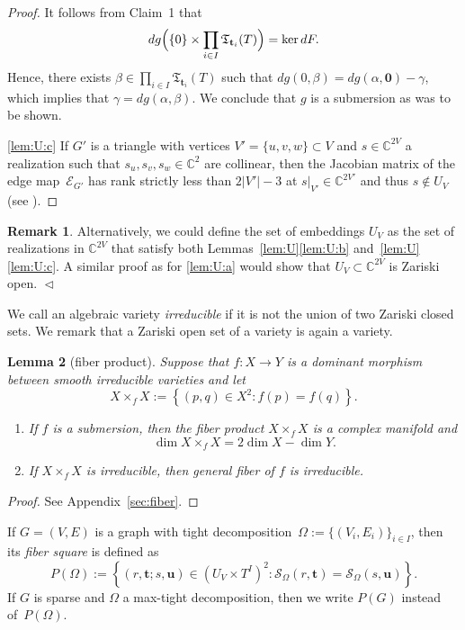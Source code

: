\documentclass[12pt]{article}
\newtheorem{lemma}{Lemma}
\theoremstyle{definition}
\newtheorem{remark}[lemma]{Remark}
\newenvironment{claims}{\begin{enumerate}[topsep=0pt,itemsep=0pt,leftmargin=8mm,label=\textnormal{\textbf{(\alph*)}},ref=(\alph*)]}{\end{enumerate}}
\newcommand{\APP}[1]{Appendix~\ref{sec:#1}}
\newcommand{\RL}[2]{\Cref{lem:#1}\ref{lem:#1:#2}}
\newcommand{\RLS}[4]{Lemmas~\ref{lem:#1}\ref{lem:#1:#2} and~\ref{lem:#3}\ref{lem:#3:#4}}
\newcommand{\END}{\hfill $\vartriangleleft$}
\newcommand{\df}[1]{{\it #1}}
\newcommand{\st}{such that }
\renewcommand{\c}{\colon}
\newcommand{\set}[2]{\left\{#1:#2\right\}}
\newcommand{\C}{{\mathbb{C}}}
\newcommand{\cE}{\mathcal{E}}
\newcommand{\cS}{\mathcal{S}}
\newcommand{\bt}{\mathbf{t}}
\newcommand{\bu}{\mathbf{u}}
\newcommand{\fT}{\mathfrak{T}}
\newcommand{\zv}{\mathbf{0}}
\begin{document}
\begin{proof}
It follows from Claim~1 that
\[
dg\Bigl(\{0\}\times\prod_{i\in I}\fT_{\bt_i}(T)\Bigr)=\ker dF.
\]
Hence, there exists $\beta\in\prod_{i\in I}\fT_{\bt_i}(T)$ \st $dg(0,\beta)=dg(\alpha,\zv)-\gamma$,
which implies that $\gamma=dg(\alpha,\beta)$.
We conclude that $g$ is a submersion as was to be shown.

\ref{lem:U:c}
If $G'$ is a triangle with vertices $V'=\{u,v,w\}\subset V$
and $s\in \C^{2V}$ a realization \st $s_u,s_v,s_w\in\C^2$ are collinear,
then the Jacobian matrix of the edge map~$\cE_{G'}$
has rank strictly less than $2|V'|-3$ at $s|_{V'}\in \C^{2V'}$ and thus $s\notin U_V$
(see \citep[18.1]{2019hb}).
\end{proof}

\begin{remark}
Alternatively, we could define the set of embeddings $U_V$ as
the set of realizations in $\C^{2V}$ that satisfy both \RLS{U}{b}{U}{c}.
A similar proof as for \RL{U}{a} would show that $U_V \subset \C^{2V}$
is Zariski open.
\END
\end{remark}


We call an algebraic variety \df{irreducible} if it is not the union
of two Zariski closed sets.
We remark that a Zariski open set of a variety is again a variety.

\begin{lemma}[fiber product]
\label{lem:XxX}
Suppose that $f\c X\to Y$ is a dominant morphism between
smooth irreducible varieties and let
\[
X\times_f X:=\set{(p,q)\in X^2}{f(p)=f(q)}.
\]
\begin{claims}
\item\label{lem:XxX:a}
If $f$ is a submersion, then the fiber product $X\times_f X$ is a complex manifold and
\[
\dim X\times_f X=2\dim X-\dim Y.
\]
\item\label{lem:XxX:b}
If $X\times_f X$ is irreducible, then general fiber of $f$ is irreducible.
\end{claims}
\end{lemma}

\begin{proof}
See \APP{fiber}.
\end{proof}

If $G=(V,E)$ is a graph
with tight decomposition~$\Omega:=\{(V_i,E_i)\}_{i\in I}$,
then its \df{fiber square}
is defined as
\[
P(\Omega):=\set{(r,\bt;s,\bu)\in \left(U_V\times T^I\right)^2}{\cS_\Omega(r,\bt)=\cS_\Omega(s,\bu)}.
\]
If $G$ is sparse and $\Omega$ a max-tight decomposition, then we write $P(G)$ instead of~$P(\Omega)$.
\end{document}
